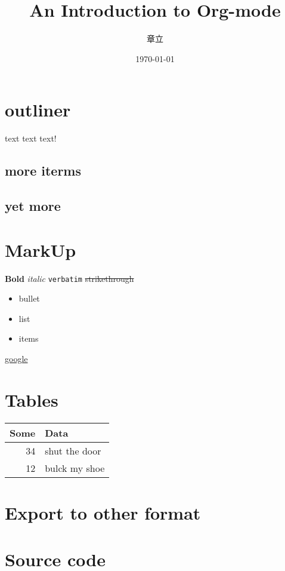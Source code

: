 \documentclass[11pt]{article}
\author{章立}
\date{\today}
\title{An Introduction to Org-mode}
\begin{document}
\maketitle

\section{outliner}
\label{sec:orgheadline3}
text text text!
\subsection{more iterms}
\label{sec:orgheadline1}
\subsection{yet more}
\label{sec:orgheadline2}

\section{MarkUp}
\label{sec:orgheadline4}
\textbf{Bold} \emph{italic} \texttt{verbatim} \sout{strikethrough}

\begin{itemize}
\item bullet
\item list
\item items
\end{itemize}

\href{https://google.com.au}{google}
\section{Tables}
\label{sec:orgheadline5}

\begin{center}
\begin{tabular}{rl}
Some & Data\\
\hline
34 & shut the door\\
12 & bulck my shoe\\
\end{tabular}
\end{center}

\section{Export to other format}
\label{sec:orgheadline6}


\section{Source code}
\label{sec:orgheadline7}
\end{document}
